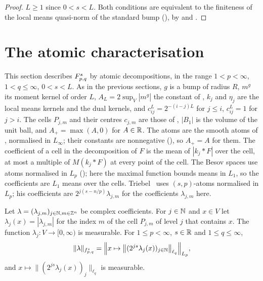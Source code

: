 \begin{proof}
\leanok
$L \geq 1$ since $0 < s < L$. Both conditions are equivalent to the finiteness of the local means
quasi-norm of the standard bump (), by
 and .
\end{proof}

\section{The atomic characterisation}
\label{sec:tl-atomic}

This section describes $F^{s}_{p,q}$ by atomic decompositions, in the range $1 < p < \infty$,
$1 < q \leq \infty$, $0 < s < L$. As in the previous sections, $g$ is a bump of radius $R$,
$m^g$ its moment kernel of order $L$, $A_L = 2 \sup_V |m^g|$ the constant of
, $k_j$ and $\eta_j$ are the local means kernels and the dual
kernels, and $c^L_{ij} = 2^{-(i-j)L}$ for $j \leq i$, $c^L_{ij} = 1$ for $j > i$. The cells
$P_{j,m}$ and their centres $c_{j,m}$ are those of , $|B_1|$ is the
volume of the unit ball, and $A_+ = \max(A, 0)$ for $A \in \mathbb{R}$. The atoms are the smooth atoms
of , normalised in $L_\infty$; their constants are nonnegative
(), so $A_+ = A$ for them. The coefficient of a cell in the
decomposition of $F$ is the mean of $|k_j * F|$ over the cell, at most a multiple of
$M(k_j * F)$ at every point of the cell. The Besov spaces use atoms normalised in $L_p$
(); here the maximal function bounds means in $L_1$, so the
coefficients are $L_1$ means over the cells. Triebel~\cite{TriebelII} uses $(s,p)$-atoms
normalised in $L_p$; his coefficients are $2^{j(s - n/p)} \lambda_{j,m}$ for the coefficients
$\lambda_{j,m}$ here.

\begin{definition}
\label{def:tl-sequence-space}
\leanok
{}
Let $\lambda = (\lambda_{j,m})_{j \in \mathbb{N}, m \in \mathbb{Z}^n}$ be complex coefficients. For $j \in \mathbb{N}$ and
$x \in V$ let $\lambda_j(x) = |\lambda_{j,m}|$ for the index $m$ of the cell $P_{j,m}$ of level
$j$ that contains $x$. The function $\lambda_j : V \to [0, \infty)$ is measurable. For
$1 \leq p < \infty$, $s \in \mathbb{R}$ and $1 \leq q \leq \infty$,
\[
  \|\lambda\|_{f^s_{p,q}} = \Bigl\| x \mapsto \bigl\| (2^{js} \lambda_j(x))_{j \in \mathbb{N}}
  \bigr\|_{\ell_q} \Bigr\|_{L_p} ,
\]
and $x \mapsto \|(2^{js} \lambda_j(x))_j\|_{\ell_q}$ is measurable.
\end{definition}

